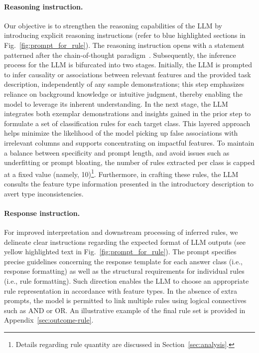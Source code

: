 \paragraph{Reasoning instruction.} Our objective is to strengthen the reasoning capabilities of the LLM by introducing explicit reasoning instructions (refer to blue highlighted sections in Fig.~\ref{fig:prompt_for_rule}). The reasoning instruction opens with a statement patterned after the chain-of-thought paradigm~\cite{wei2022chain}. Subsequently, the inference process for the LLM is bifurcated into two stages. Initially, the LLM is prompted to infer causality or associations between relevant features and the provided task description, independently of any sample demonstrations; this step emphasizes reliance on background knowledge or intuitive judgment, thereby enabling the model to leverage its inherent understanding. In the next stage, the LLM integrates both exemplar demonstrations and insights gained in the prior step to formulate a set of classification rules for each target class. This layered approach helps minimize the likelihood of the model picking up false associations with irrelevant columns and supports concentrating on impactful features. To maintain a balance between specificity and prompt length, and avoid issues such as underfitting or prompt bloating, the number of rules extracted per class is capped at a fixed value (namely, 10)\footnote{Details regarding rule quantity are discussed in Section~\ref{sec:analysis}.}. Furthermore, in crafting these rules, the LLM consults the feature type information presented in the introductory description to avert type inconsistencies.

\vspace*{-0.12in}
\paragraph{Response instruction.} For improved interpretation and downstream processing of inferred rules, we delineate clear instructions regarding the expected format of LLM outputs (see yellow highlighted text in Fig.~\ref{fig:prompt_for_rule}). The prompt specifies precise guidelines concerning the response template for each answer class (i.e., response formatting) as well as the structural requirements for individual rules (i.e., rule formatting). Such direction enables the LLM to choose an appropriate rule representation in accordance with feature types. In the absence of extra prompts, the model is permitted to link multiple rules using logical connectives such as AND or OR. An illustrative example of the final rule set is provided in Appendix~\ref{sec:outcome-rule}.

